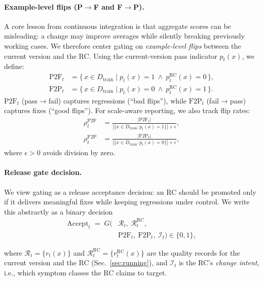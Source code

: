 \documentclass[11pt]{article}
\begin{document}
\paragraph{Example-level flips (P$\rightarrow$F and F$\rightarrow$P).}
A core lesson from continuous integration is that aggregate scores can be misleading: a change may improve averages while silently breaking previously working cases. We therefore center gating on \emph{example-level flips} between the current version and the RC. Using the current-version pass indicator $p_t(x)$, we define:
\begin{align}
\mathrm{P2F}_t &= \{\, x \in D_{\text{train}} \mid p_t(x)=1 \ \wedge\ p_t^{\mathrm{RC}}(x)=0 \,\}, \label{eq:p2f}\\
\mathrm{F2P}_t &= \{\, x \in D_{\text{train}} \mid p_t(x)=0 \ \wedge\ p_t^{\mathrm{RC}}(x)=1 \,\}. \label{eq:f2p}
\end{align}
$\mathrm{P2F}_t$ (pass$\rightarrow$fail) captures regressions (``bad flips''), while $\mathrm{F2P}_t$ (fail$\rightarrow$pass) captures fixes (``good flips''). For scale-aware reporting, we also track flip rates:
\begin{align}
\rho_t^{\mathrm{P2F}} &= \frac{|\mathrm{P2F}_t|}{|\{x\in D_{\text{train}}: p_t(x)=1\}|+\epsilon}, \\
\rho_t^{\mathrm{F2P}} &= \frac{|\mathrm{F2P}_t|}{|\{x\in D_{\text{train}}: p_t(x)=0\}|+\epsilon},
\end{align}
where $\epsilon>0$ avoids division by zero.

\paragraph{Release gate decision.}
We view gating as a release acceptance decision: an RC should be promoted only if it delivers meaningful fixes while keeping regressions under control. We write this abstractly as a binary decision
\begin{equation}
\begin{aligned}
\mathrm{Accept}_t \;=\;
G\!\big(&\mathcal{R}_t,\ \mathcal{R}_t^{\mathrm{RC}},\\
        &\mathrm{P2F}_t,\ \mathrm{F2P}_t,\ \mathcal{I}_t\big)
\in \{0,1\},
\end{aligned}
\label{eq:gate}
\end{equation}

where $\mathcal{R}_t=\{r_t(x)\}$ and $\mathcal{R}_t^{\mathrm{RC}}=\{r_t^{\mathrm{RC}}(x)\}$ are the quality records for the current version and the RC (Sec.~\ref{sec:running}), and $\mathcal{I}_t$ is the RC's \emph{change intent}, i.e., which symptom classes the RC claims to target.
\end{document}
